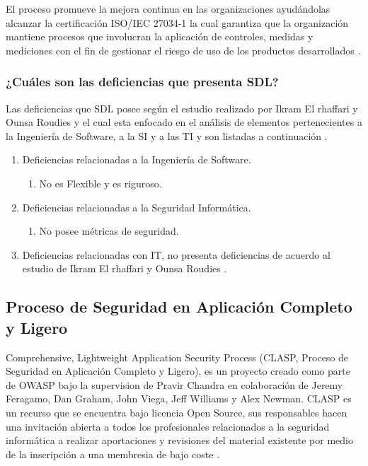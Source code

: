 \documentclass[runningheads,a4paper]{llncs}
\begin{document}
El proceso promueve la mejora continua en las organizaciones ayudándolas alcanzar la certificación ISO/IEC 27034-1 la cual garantiza que la organización mantiene procesos que involucran la aplicación de controles, medidas y mediciones con el fin de gestionar el riesgo de uso de los productos desarrollados \cite{SDLWhitePaper}. 

\subsubsection{¿Cuáles son las deficiencias que presenta \gls{SDL}?}
Las deficiencias que \gls{SDL} posee según el estudio realizado por Ikram El rhaffari y Ounsa Roudies y el cual esta enfocado en el análisis de elementos pertenecientes a la Ingeniería de \gls{Software}, a la \gls{SI} y a las \gls{TI} y son listadas a continuación \cite{BenchmarkingSDLCLAPS}. 

\begin{enumerate}
	\item Deficiencias relacionadas a la Ingeniería de \gls{Software}.
		\begin{enumerate}
			\item No es \gls{Flexible} y es riguroso.\\
			
		\end{enumerate}
	\item Deficiencias relacionadas a la Seguridad Informática.
		\begin{enumerate}
			\item No posee métricas de seguridad.\\
			
		\end{enumerate}
	\item Deficiencias relacionadas con \gls{IT}, no presenta deficiencias de acuerdo al estudio de Ikram El rhaffari y Ounsa Roudies \cite{BenchmarkingSDLCLAPS}.
		
\end{enumerate}

\subsection{Proceso de Seguridad en Aplicación Completo y Ligero}
Comprehensive, Lightweight Application Security Process (CLASP, Proceso de Seguridad en Aplicación Completo y Ligero), es un proyecto creado como parte de \gls{OWASP} bajo la supervision de Pravir Chandra en colaboración de Jeremy Feragamo, Dan Graham, John Viega, Jeff Williams y Alex Newman. \gls{CLASP} es un recurso que se encuentra bajo licencia \gls{Open Source}, sus responsables hacen una invitación abierta a todos los profesionales relacionados a la seguridad informática a realizar aportaciones y revisiones del material existente por medio de la inscripción a una membresia de bajo coste \cite{CLASPIntroduction}.
\end{document}
